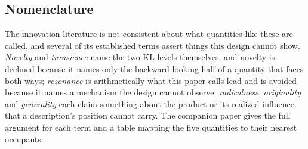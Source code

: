 \subsection{Nomenclature}\label{sec:nomenclature}

The innovation literature is not consistent about what quantities like
these are called, and several of its established terms assert things this
design cannot show. \emph{Novelty} and \emph{transience}
\citep{Murdock2017} name the two KL levels themselves, and novelty is
declined because it names only the backward-looking half of a quantity
that faces both ways; \emph{resonance} \citep{Barron2018} is
arithmetically what this paper calls lead and is avoided because it names
a mechanism the design cannot observe; \emph{radicalness},
\emph{originality} and \emph{generality} \citep{HallJaffe2001,
Verhoeven2025} each claim something about the product or its realized
influence that a description's position cannot carry. The companion paper
gives the full argument for each term and a table mapping the five
quantities to their nearest occupants \citep{SilverCorpus2026}.
